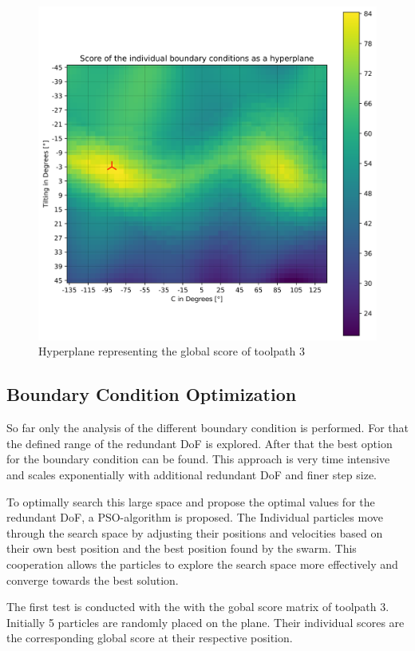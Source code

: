\begin{figure}[H]
	\centerline{\includegraphics[width=1\textwidth]{figures/best_2D_3.png}}
	\caption{Hyperplane representing the global score of toolpath 3}
	\label{best_2D}
\end{figure}

\newpage
\subsection{Boundary Condition Optimization }
So far only the analysis of the different boundary condition is performed. For that the defined range of the redundant DoF is explored. After that the best option for the boundary condition can be found. This approach is very time intensive and scales exponentially with additional redundant DoF and finer step size.  

To optimally search this large space and propose the optimal values for the redundant DoF, a PSO-algorithm is proposed. The Individual particles move through the search space by adjusting their positions and velocities based on their own best position and the best position found by the swarm. This cooperation allows the particles to explore the search space more effectively and converge towards the best solution.

The first test is conducted with the with the gobal score matrix of toolpath 3. 
Initially 5 particles are randomly placed on the plane. Their individual scores are the corresponding global score at their respective position.


